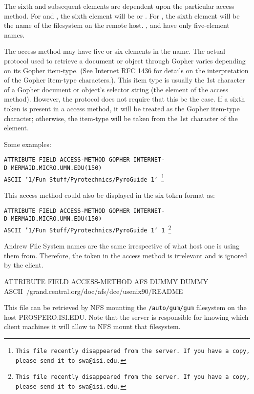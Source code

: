 \begin{description}
The sixth and subsequent elements are dependent upon the particular
access method.  For  and , the sixth element will be
 or .  For , the sixth
element will be the name of the filesystem on the remote host.
, and  have only five-element names.

The  access method may have five or six elements in the
name.  The actual protocol used to retrieve a document or object
through Gopher varies depending on its Gopher item-type.  (See
Internet RFC 1436 for details on the interpretation of the Gopher
item-type characters.).  This item type is usually the 1st character
of a Gopher document or object's selector string (the 
element of the access method).  However, the protocol does not require
that this be the case.  If a sixth token is present in a 
access method, it will be treated as the Gopher item-type character;
otherwise, the item-type will be taken from the 1st character of the
 element.



Some examples: 

\begin{command}
\tt \sloppy ATTRIBUTE FIELD ACCESS-METHOD GOPHER 
INTERNET-D~MERMAID.MICRO.UMN.EDU(150)
ASCII~\mbox{'1/Fun Stuff/Pyrotechnics/PyroGuide\ 1'}%
\footnote{This file recently
	disappeared from the server.  If you have a copy, please send it to
	\verb"swa@isi.edu".} 

{\rm \par This access method could also be displayed in the six-token
format as:}

\tt \sloppy ATTRIBUTE FIELD ACCESS-METHOD GOPHER 
INTERNET-D~MERMAID.MICRO.UMN.EDU(150)
ASCII~\mbox{'1/Fun Stuff/Pyrotechnics/PyroGuide\ 1'}~1%
\footnote{This file recently
	disappeared from the server.  If you have a copy, please send it to
	\verb"swa@isi.edu".} 

{\rm \par Andrew File System names are the same irrespective of what host
one is using them from.  Therefore, the  token in the
access method is irrelevant and is ignored by the client.}

ATTRIBUTE FIELD ACCESS-METHOD AFS DUMMY DUMMY
ASCII~\mbox{/grand.central.org/doc/afs/dce/usenix90/README}

{\rm \par This file can be retrieved by NFS mounting the {\tt /auto/gum/gum}
filesystem on the host PROSPERO.ISI.EDU.  Note that the server is
responsible for knowing which client machines it will allow to NFS
mount that filesystem.}


\end{command}
\end{description}
